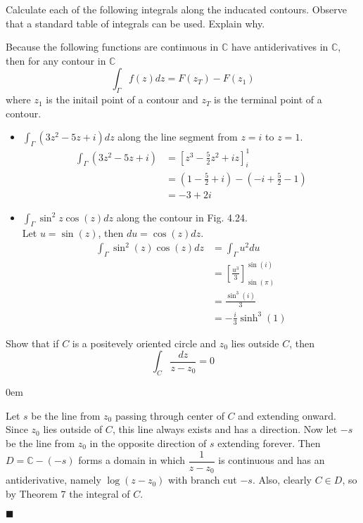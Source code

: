 \documentclass[12pt]{article}
\author{Warren Atkison}
\date{\today}
\renewcommand{\qed}{\hfill$\blacksquare$}
\renewenvironment{proof}{\vspace{1em}\begin{addmargin}[2em]{0em}\begin{newproof}}{\end{newproof}\end{addmargin}\qed}
\newenvironment{exercise}[2][Exercise]{\begin{trivlist}
\item[\hskip \labelsep {\bfseries #1} \hskip \labelsep {\bfseries #2.}]}{\end{trivlist}}
\begin{document}
\fancyhf{}
\fancyhead[R]{\today}
\fancyfoot[R]{\thepage}

\begin{exercise}{1}
	Calculate each of the following integrals along the inducated contours. Observe that a standard table of integrals can be used. Explain why.
\end{exercise}
Because the following functions are continuous in $\mathbb{C}$ have antiderivatives in $\mathbb{C}$, then for any contour in $\mathbb{C}$
\[
	\int_{\Gamma}f(z)dz = F(z_T) - F(z_1)
\]
where $z_1$ is the initail point of a contour and $z_T$ is the terminal point of a contour.
\begin{itemize}
	\item[(a)] $\int_{\Gamma} (3z^2 - 5z + i)dz$ along the line segment from $z = i$ to $z = 1$.
		\begin{align*}
			\int_{\Gamma} (3z^2 - 5z + i) &= \left[z^3 - \frac{5}{2}z^2 + iz\right]_{i}^{1} \\
						      &= \left(1 - \frac{5}{2} + i\right) - \left(-i + \frac{5}{2} - 1\right) \\
						      &= -3 + 2i 
		\end{align*}
	\item[(e)] $\int_{\Gamma} \sin^2 z\cos(z)dz$ along the contour in Fig. 4.24. \\
		Let $u = \sin(z)$, then $du = \cos(z)dz$.
		\begin{align*}
			\int_{\Gamma} \sin^2(z)\cos(z)dz &= \int_{\Gamma} u^2du \\
							 &= \left[\frac{u^3}{3}\right]_{\sin(\pi)}^{\sin(i)} \\
							 &= \frac{\sin^3(i)}{3} \\
							 &= -\frac{i}{3}\sinh^3(1)
		\end{align*}
\end{itemize}
\begin{exercise}{7}
	Show that if $C$ is a positevely oriented circle and $z_0$ lies outside $C$, then
	\[
		\int_{C}\frac{dz}{z - z_0} = 0
	\]
\end{exercise}	
\begin{proof}
	Let $s$ be the line from $z_0$ passing through center of $C$ and extending onward. Since $z_0$ lies outside of $C$, this line always exists and has a direction. Now let $-s$ be the line from $z_0$ in the opposite direction of $s$ extending forever. Then $D = \mathbb{C} - (-s)$ forms a domain in which $\dfrac{1}{z - z_0}$ is continuous and has an antiderivative, namely $\log(z - z_0)$ with branch cut $-s$. Also, clearly $C \in D$, so by Theorem 7 the integral of $C$.
\end{proof}
\end{document}
